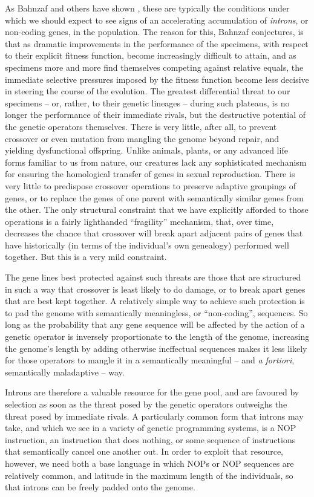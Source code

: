 \documentclass[12pt,glossary]{dalthesis}
\begin{document}
As Bahnzaf and others have shown \cite{nordin95} \cite{banzhaf98}, these are typically the conditions
under which we should expect to see signs of an accelerating accumulation of
\emph{introns}, or non-coding genes, in the population. The reason for this, Bahnzaf
conjectures, is that as dramatic improvements in the performance of the
specimens, with respect to their explicit fitness function, become increasingly
difficult to attain, and as specimens more and more find themselves competing
against relative equals, the immediate selective pressures imposed by the
fitness function become less decisive in steering the course of the evolution.
The greatest differential threat to our specimens -- or, rather, to their
genetic lineages -- during such plateaus, is no longer the performance of their
immediate rivals, but the destructive potential of the genetic operators
themselves. There is very little, after all, to prevent crossover or even
mutation from mangling the genome beyond repair, and yielding dysfunctional
offspring. Unlike animals, plants, or any advanced life forms familiar to us
from nature, our creatures lack any sophisticated mechanism for ensuring the
homological transfer of genes in sexual reproduction. There is very little to
predispose crossover operations to preserve adaptive groupings of genes, or to
replace the genes of one parent with semantically similar genes from the other.
The only structural constraint that we have explicitly afforded to those
operations is a fairly lighthanded ``fragility'' mechanism, that, over time,
decreases the chance that crossover will break apart adjacent pairs of genes
that have historically (in terms of the individual's own genealogy) performed
well together. But this is a very mild constraint.

The gene lines best protected against such threats are those that are structured
in such a way that crossover is least likely to do damage, or to break apart
genes that are best kept together. A relatively simple way to achieve such
protection is to pad the genome with semantically meaningless, or ``non-coding'',
sequences. So long as the probability that any gene sequence will be affected by
the action of a genetic operator is inversely proportionate to the length of the
genome, increasing the genome's length by adding otherwise ineffectual sequences
makes it less likely for those operators to mangle it in a semantically
meaningful -- and \emph{a fortiori}, semantically maladaptive -- way.

Introns are therefore a valuable resource for the gene pool, and are favoured by
selection as soon as the threat posed by the genetic operators outweighs the
threat posed by immediate rivals. A particularly common form that introns may
take, and which we see in a variety of genetic programming systems, is a NOP
instruction, an instruction that does nothing, or some sequence of instructions
that semantically cancel one another out. In order to exploit that resource,
however, we need both a base language in which NOPs or NOP sequences are
relatively common, and latitude in the maximum length of the individuals, so
that introns can be freely padded onto the genome.
\end{document}
